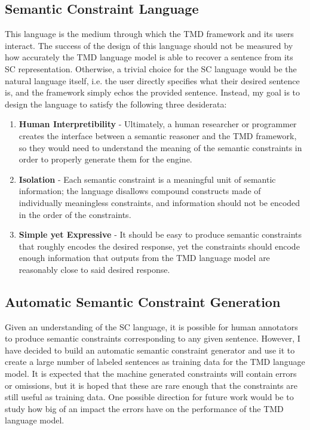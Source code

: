 \documentclass{article}
\numberwithin{equation}{section}
\begin{document}
\subsection{Semantic Constraint Language}

This language is the medium through which the TMD framework and its users interact. The success of the design of this language should not be measured by how accurately the TMD language model is able to recover a sentence from its SC representation. Otherwise, a trivial choice for the SC language would be the natural language itself, i.e. the user directly specifies what their desired sentence is, and the framework simply echos the provided sentence. Instead, my goal is to design the language to satisfy the following three desiderata:

\begin{enumerate}[topsep=0pt, partopsep=0pt, itemsep=2pt, parsep=0pt]
\item \textbf{Human Interpretibility} - Ultimately, a human researcher or programmer creates the interface between a semantic reasoner and the TMD framework, so they would need to understand the meaning of the semantic constraints in order to properly generate them for the engine.
\item \textbf{Isolation} - Each semantic constraint is a meaningful unit of semantic information; the language disallows compound constructs made of individually meaningless constraints, and information should not be encoded in the order of the constraints.
\item \textbf{Simple yet Expressive} - It should be easy to produce semantic constraints that roughly encodes the desired response, yet the constraints should encode enough information that outputs from the TMD language model are reasonably close to said desired response.
\end{enumerate}

\subsection{Automatic Semantic Constraint Generation}

Given an understanding of the SC language, it is possible for human annotators to produce semantic constraints corresponding to any given sentence. However, I have decided to build an automatic semantic constraint generator and use it to create a large number of labeled sentences as training data for the TMD language model. It is expected that the machine generated constraints will contain errors or omissions, but it is hoped that these are rare enough that the constraints are still useful as training data. One possible direction for future work would be to study how big of an impact the errors have on the performance of the TMD language model.
\end{document}
